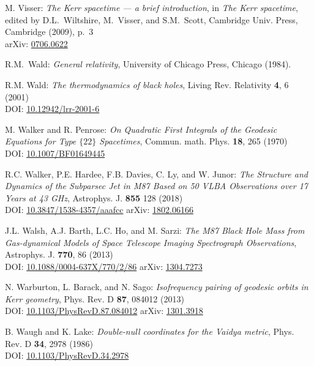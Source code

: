 \begin{thebibliography}{123}
M. Visser: {\em The Kerr spacetime --- a brief introduction},
in {\em The Kerr spacetime}, edited by D.L.~Wiltshire, M.~Visser, and S.M.~Scott,
Cambridge Univ. Press, Cambridge (2009), p.~3\\
arXiv: \href{https://arxiv.org/abs/0706.0622}{0706.0622}

R.M.~Wald: {\em General relativity},
University of Chicago Press, Chicago (1984).

R.M. Wald: {\em The thermodynamics of black holes},
Living Rev. Relativity {\bf 4}, 6 (2001) \\
DOI: \href{https://doi.org/10.12942/lrr-2001-6}{10.12942/lrr-2001-6}

M. Walker and R. Penrose: {\em On Quadratic First Integrals of the Geodesic Equations
for Type $\{22\}$ Spacetimes},
Commun. math. Phys. {\bf 18}, 265 (1970)\\
DOI: \href{https://doi.org/10.1007/BF01649445}{10.1007/BF01649445}

R.C. Walker, P.E. Hardee, F.B. Davies, C. Ly, and W. Junor:
{\em The Structure and Dynamics of the Subparsec Jet in M87 Based on 50 VLBA Observations over 17 Years at 43 GHz},
Astrophys. J. {\bf 855} 128 (2018)\\
DOI: \href{https://doi.org/10.3847/1538-4357/aaafcc}{10.3847/1538-4357/aaafcc}\hfill
arXiv: \href{https://arxiv.org/abs/1802.06166}{1802.06166}

J.L. Walsh, A.J. Barth, L.C. Ho, and M. Sarzi:
{\em The M87 Black Hole Mass from Gas-dynamical Models of Space Telescope Imaging Spectrograph Observations},
Astrophys. J. {\bf 770}, 86 (2013)\\
DOI: \href{https://doi.org/10.1088/0004-637X/770/2/86}{10.1088/0004-637X/770/2/86}\hfill
arXiv: \href{https://arxiv.org/abs/1304.7273}{1304.7273}

N. Warburton, L. Barack, and N. Sago:
{\em Isofrequency pairing of geodesic orbits in Kerr geometry},
Phys. Rev. D {\bf 87}, 084012 (2013)\\
DOI: \href{https://doi.org/10.1103/PhysRevD.87.084012}{10.1103/PhysRevD.87.084012}\hfill
arXiv: \href{https://arxiv.org/abs/1301.3918}{1301.3918}

B. Waugh and K. Lake:
{\em Double-null coordinates for the Vaidya metric},
Phys. Rev. D {\bf 34}, 2978 (1986)\\
DOI: \href{https://doi.org/10.1103/PhysRevD.34.2978}{10.1103/PhysRevD.34.2978}


\end{thebibliography}

